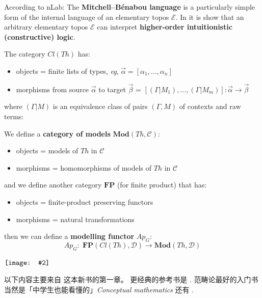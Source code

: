 \documentclass[12pt, orivec]{article}
\newcommand{\book}[1]{$\NewSym[0.4]{../book-icon.png} \quad$ \parbox{0.9\textwidth}{\footnotesize #1}}
\newcommand*\NewSym[2][0.5]{\vcenter{\hbox{\texttt{[image: \#2]}}}}
\begin{document}
According to nLab:  The \textbf{Mitchell–B\'{e}nabou language} is a particularly simple form of the internal language of an elementary topos $\mathscr{E}$.  In \parencite{Streicher2006} it is show that an arbitrary elementary topos $\mathscr{E}$ can interpret \textbf{higher-order intuitionistic (constructive) logic}.

The category $Cl(Th)$ has:
\begin{itemize}
\item objects = finite lists of types, \textit{eg}, $\vec{\alpha} = [\alpha_1, ..., \alpha_n] $
\item morphisms from source $\vec{\alpha}$ to target $\vec{\beta}$ = $[(\Gamma|M_1), ..., (\Gamma|M_m)] : \vec{\alpha} \rightarrow \vec{\beta}$
\end{itemize}
where $(\Gamma|M)$ is an equivalence class of pairs $(\Gamma, M)$ of contexts and raw terms:

We define a \textbf{category of models} $\mathbf{Mod}(Th, \mathscr{C})$:
\begin{itemize}
\item objects = models of $Th$ in $\mathscr{C}$
\item morphisms = homomorphisms of models of $Th$ in $\mathscr{C}$
\end{itemize}
and we define another category $\mathbf{FP}$ (for finite product) that has:
\begin{itemize}
\item objects = finite-product preserving functors
\item morphisms = natural transformations
\end{itemize}
then we can define a \textbf{modelling functor} $Ap_G$:
\begin{equation}
Ap_G: \; \mathbf{FP}(Cl(Th), \mathscr{D}) \rightarrow \mathbf{Mod}(Th, \mathscr{D})
\end{equation}

\book{以下内容主要来自 \parencite{Caramello2018} 这本新书的第一章。  更经典的参考书是 \parencite{Goldblatt1984}.  范畴论最好的入门书当然是「中学生也能看懂的」\textit{Conceptual mathematics} \parencite{Lawvere1997} 还有 \parencite{Lawvere2003}.}
\end{document}
